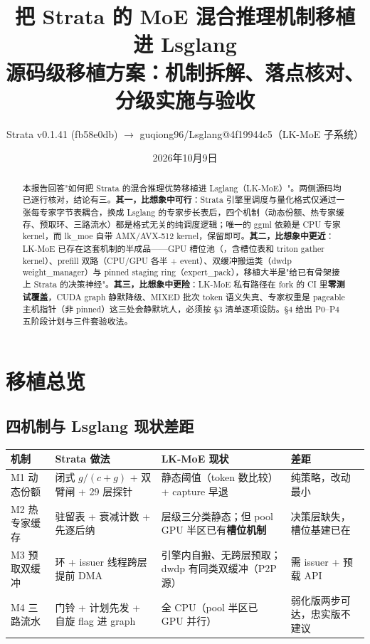 \documentclass[11pt,a4paper]{ctexart}
\title{\bfseries 把 Strata 的 MoE 混合推理机制移植进 Lsglang\\[6pt]
  \large 源码级移植方案：机制拆解、落点核对、分级实施与验收}
\author{Strata v0.1.41 (fb58e0db) $\rightarrow$ guqiong96/Lsglang@4f19944c5（LK-MoE 子系统）}
\date{2026年10月9日}
\newcommand{\code}[1]{{\footnotesize\color{kwcol}\ttfamily\detokenize{#1}}}
\begin{document}
\maketitle
\begin{abstract}
\noindent
本报告回答"如何把 Strata 的混合推理优势移植进 Lsglang（LK-MoE）"。两侧源码均已逐行核对，结论有三。\textbf{其一，比想象中可行}：Strata 引擎里调度与量化格式仅通过一张每专家字节表耦合，换成 Lsglang 的专家步长表后，四个机制（动态份额、热专家缓存、预取环、三路流水）都是格式无关的纯调度逻辑；唯一的 ggml 依赖是 CPU 专家 kernel，而 lk\_moe 自带 AMX/AVX-512 kernel，保留即可。\textbf{其二，比想象中更近}：LK-MoE 已存在这套机制的半成品——GPU 槽位池（\code{pool\_gpu\_half}，含槽位表和 triton gather kernel）、prefill 双路（CPU/GPU 各半 + event）、双缓冲搬运类（dwdp weight\_manager）与 pinned staging ring（expert\_pack），移植大半是"给已有骨架接上 Strata 的决策神经"。\textbf{其三，比想象中更险}：LK-MoE 私有路径在 fork 的 CI 里\textbf{零测试覆盖}，CUDA graph 静默降级、MIXED 批次 token 语义失真、专家权重是 pageable 主机指针（非 pinned）这三处会静默坑人，必须按 §3 清单逐项设防。§4 给出 P0--P4 五阶段计划与三件套验收法。
\end{abstract}

\tableofcontents
\newpage

\section{移植总览}

\subsection{四机制与 Lsglang 现状差距}

\begin{center}\small
\begin{tabular}{@{}p{2.9cm}p{4.8cm}p{4.9cm}p{2.6cm}@{}}
\toprule
\rowcolor{tabhead}
\textbf{机制} & \textbf{Strata 做法} & \textbf{LK-MoE 现状} & \textbf{差距} \\
\midrule
M1 动态份额 & 闭式 $g/(c+g)$ + 双臂闸 + 29 层探针 & 静态阈值（token 数比较）+ capture 早退 & 纯策略，改动最小 \\
M2 热专家缓存 & 驻留表 + 衰减计数 + 先逐后纳 & 层级三分类静态；但 pool GPU 半区已有\textbf{槽位机制} & 决策层缺失，槽位基建已在 \\
M3 预取双缓冲 & 环 + issuer 线程跨层提前 DMA & \code{\_gpu\_prefill} 引擎内自搬、无跨层预取；dwdp 有同类双缓冲（P2P 源） & 需 issuer + 预载 API \\
M4 三路流水 & 门铃 + 计划先发 + 自旋 flag 进 graph & \code{\_cpu\_decode} 全 CPU（pool 半区已 GPU 并行） & 弱化版两步可达，忠实版不建议 \\
\bottomrule
\end{tabular}
\end{center}
\end{document}
